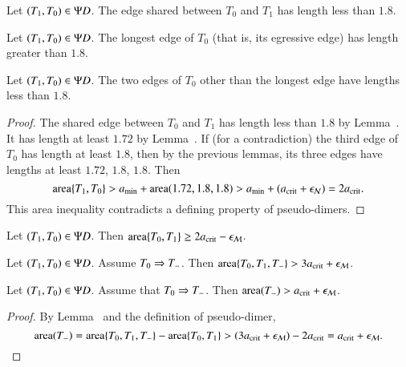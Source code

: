 \begin{lemma}  
Let $(T_1,T_0)\in \Psi D$.  The edge shared between
$T_0$ and $T_1$ has length less than $1.8$. 
\end{lemma}

\begin{lemma} 
  Let $(T_1,T_0)\in \Psi D$.  The longest edge of $T_0$ (that is, its
  egressive edge) has length greater than $1.8$.
\end{lemma}

\begin{lemma}  
  Let $(T_1,T_0)\in \Psi D$.  The two edges of $T_0$ other than the
  longest edge have lengths less than $1.8$.
\end{lemma}

\begin{proof}
  The shared edge between $T_0$ and $T_1$ has length less than $1.8$
  by Lemma~.  It has length at least $1.72$ by
  Lemma~.  If (for a contradiction) the third edge of
  $T_0$ has length at least $1.8$, then by the previous lemmas, its
  three edges have lengths at least $1.72$, $1.8$, $1.8$.  Then
\[
{\operatorname{area}}\{T_1,T_0\} > a_\text{min} + {\operatorname{area}}(1.72,1.8,1.8) 
> a_\text{min} + (a_\text{crit} + \epsilon_{\mathcal N}) = 2a_\text{crit}.
\]
This area inequality contradicts a defining property of pseudo-dimers.
\end{proof}

\begin{lemma}
Let $(T_1,T_0)\in\Psi D$.  Then ${\operatorname{area}}\{T_0,T_1\} \ge 2a_\text{crit} - \epsilon_{\mathcal M}$.
\end{lemma}

\begin{lemma}
Let $(T_1,T_0)\in\Psi D$. Assume $T_0\Rightarrow T_-$.  
Then ${\operatorname{area}}\{T_0,T_1,T_-\} > 3a_\text{crit} + \epsilon_{\mathcal M}$.
\end{lemma}

\begin{corollary} 
Let $(T_1,T_0)\in\Psi D$.  Assume that $T_0\Rightarrow T_-$.  Then
${\operatorname{area}}(T_-) > a_\text{crit}+\epsilon_{\mathcal M}$.
\end{corollary}

\begin{proof}  
  By Lemma~ and the definition of pseudo-dimer,
\[
{\operatorname{area}}(T_-) = {\operatorname{area}}\{T_0,T_1,T_-\} - {\operatorname{area}}\{T_0,T_1\} 
> (3a_\text{crit} + \epsilon_{\mathcal M}) - 2a_\text{crit} = a_\text{crit} + \epsilon_{\mathcal M}.
\]
\end{proof}

